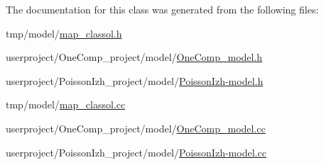 The documentation for this class was generated from the following files\+:\begin{DoxyCompactItemize}
\item 
tmp/model/\hyperlink{tmp_2model_2map__classol_8h}{map\+\_\+classol.\+h}\item 
userproject/\+One\+Comp\+\_\+project/model/\hyperlink{OneComp__model_8h}{One\+Comp\+\_\+model.\+h}\item 
userproject/\+Poisson\+Izh\+\_\+project/model/\hyperlink{PoissonIzh-model_8h}{Poisson\+Izh-\/model.\+h}\item 
tmp/model/\hyperlink{tmp_2model_2map__classol_8cc}{map\+\_\+classol.\+cc}\item 
userproject/\+One\+Comp\+\_\+project/model/\hyperlink{OneComp__model_8cc}{One\+Comp\+\_\+model.\+cc}\item 
userproject/\+Poisson\+Izh\+\_\+project/model/\hyperlink{PoissonIzh-model_8cc}{Poisson\+Izh-\/model.\+cc}\end{DoxyCompactItemize}
